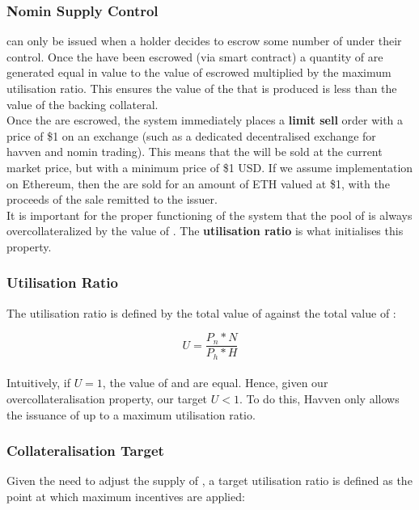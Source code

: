\subsubsection{Nomin Supply Control}

\noindent \NOM{} can only be issued when a \HAV{} holder decides to escrow some number of \HAV{} under their control. Once the \HAV{} have been escrowed (via smart contract) a quantity of \NOM{} are generated equal in value to the value of escrowed \HAV{} multiplied by the maximum utilisation ratio. This ensures the value of the \NOM{} that is produced is less than the value of the backing \HAV{} collateral. \\

\noindent Once the \HAV{} are escrowed, the system immediately places a \textbf{limit sell} order with a price of \$1 on an exchange (such as a dedicated decentralised exchange for havven and nomin trading). This means that the \NOM{} will be sold at the current market price, but with a minimum price of \$1 USD. If we assume implementation on Ethereum, then the \NOM{} are sold for an amount of ETH valued at \$1, with the proceeds of the sale remitted to the issuer. \\

\noindent It is important for the proper functioning of the system that the pool of \NOM{} is always overcollateralized by the value of \HAV{}. The \textbf{utilisation ratio} is what initialises this property.

\subsubsection{Utilisation Ratio}

\noindent The utilisation ratio is defined by the total value of \NOM{} against the total value of \HAV{}:

$$ U = \frac{P_n * N}{P_h * H} $$ \\

\noindent Intuitively, if $U = 1$, the value of \NOM{} and \HAV{} are equal. Hence, given our overcollateralisation property, our target $U <  1$. To do this, Havven only allows the issuance of \NOM{} up to a maximum utilisation ratio.

\subsubsection{Collateralisation Target}

\noindent Given the need to adjust the supply of \NOM{}, a target utilisation ratio is defined as the point at which maximum incentives are applied:

